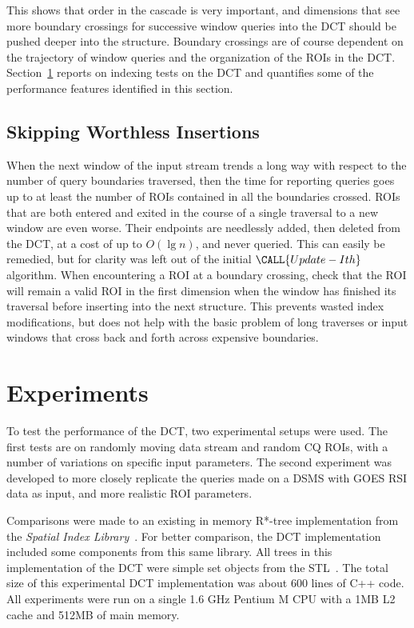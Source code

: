 \documentclass{ucdthesis}       %
\newcommand{\proc}[1]{\ensuremath{\CALL{#1}}}
\begin{document}
This shows that order in the cascade is very important, and dimensions
that see more boundary crossings for successive window queries into
the \ac{DCT} should be pushed deeper into the structure.  Boundary
crossings are of course dependent on the trajectory of window queries
and the organization of the \acp{ROI} in the \ac{DCT}.
Section~\ref{sec:experiments} reports on indexing tests on the
\ac{DCT} and quantifies some of the performance features identified in
this section.

\subsection{Skipping Worthless Insertions}
%
When the next window of the input stream trends a long way with
respect to the number of query boundaries traversed, then the time for
reporting queries goes up to at least the number of \acp{ROI} contained
in all the boundaries crossed.  \acp{ROI} that are both entered and
exited in the course of a single traversal to a new window are even
worse.  Their endpoints are needlessly added, then deleted from the
\ac{DCT}, at a cost of up to $O(\lg{n})$, and never queried.  This can
easily be remedied, but for clarity was left out of the initial
\proc{Update-Ith} algorithm.  When encountering a \ac{ROI} at a boundary
crossing, check that the \ac{ROI} will remain a valid \ac{ROI} in the
first dimension when the window has finished its traversal before
inserting into the next structure.  This prevents wasted index
modifications, but does not help with the basic problem of long
traverses or input windows that cross back and forth across expensive
boundaries.

\section{Experiments}
\label{sec:experiments}

To test the performance of the \ac{DCT}, two experimental setups were
used.  The first tests are on randomly moving data stream and random
\ac{CQ} \acp{ROI}, with a number of variations on specific input
parameters.  The second experiment was developed to more closely
replicate the queries made on a \ac{DSMS} with \ac{GOES} \ac{RSI} data
as input, and more realistic \ac{ROI} parameters.

Comparisons were made to an existing in memory R*-tree implementation
from the \emph{Spatial Index Library}~\cite{hadjiel04spatial-index}.
For better comparison, the \ac{DCT} implementation included some
components from this same library.  All trees in this implementation
of the \ac{DCT} were simple set objects from the
\acf{STL}~\cite{99stand-templ}.  The total size of this experimental
\ac{DCT} implementation was about 600 lines of C++ code.  All experiments
were run on a single 1.6 GHz Pentium M CPU with a 1MB L2 cache and
512MB of main memory.
\end{document}
